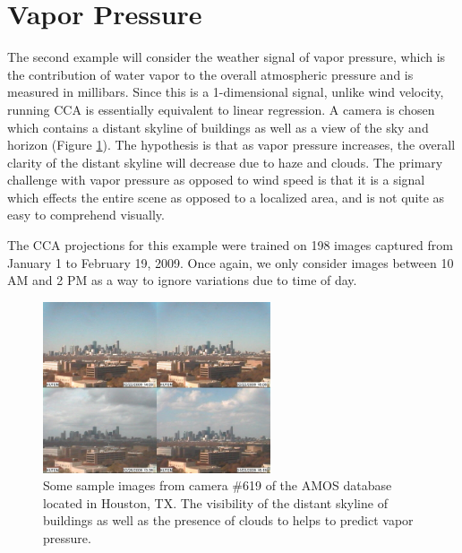 \section{Vapor Pressure}
The second example will consider the weather signal of vapor pressure, which is the contribution of water vapor to the overall atmospheric pressure and is measured in millibars. Since this is a 1-dimensional signal, unlike wind velocity, running CCA is essentially equivalent to linear regression. A camera is chosen which contains a distant skyline of buildings as well as a view of the sky and horizon (Figure \ref{fig:vaporextremes}). The hypothesis is that as vapor pressure increases, the overall clarity of the distant skyline will decrease due to haze and clouds. The primary challenge with vapor pressure as opposed to wind speed is that it is a signal which effects the entire scene as opposed to a localized area, and is not quite as easy to comprehend visually.

The CCA projections for this example were trained on 198 images captured from January 1 to February 19, 2009. Once again, we only consider images between 10 AM and 2 PM as a way to ignore variations due to time of day.
\begin{figure}
	\centering
		\includegraphics[width=0.60\textwidth]{figures/vaporextremes.jpg}
	\caption[Some sample images from camera $\#$619 of the AMOS database located in Houston, TX]{Some sample images from camera $\#$619 of the AMOS database located in Houston, TX. The visibility of the distant skyline of buildings as well as the presence of clouds to helps to predict vapor pressure.}
	\label{fig:vaporextremes}
\end{figure}

